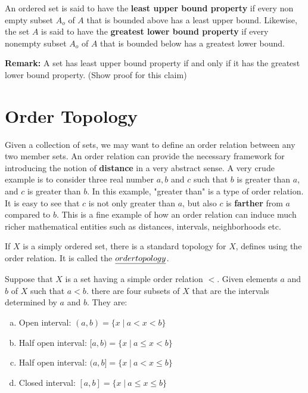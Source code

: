 \documentclass[a4paper,english,12pt]{article}
\begin{document}
\begin{defn}
An ordered set is said to have the \textbf{least upper bound property} if every non empty subset $A_{o}$ of $A$ that is bounded above has a least upper bound. Likewise, the set $A$ is said to have the \textbf{greatest lower bound property} if every nonempty subset $A_{o}$ of $A$ that is bounded below has a greatest lower bound. 
\end{defn}

\textbf{Remark:} A set has least upper bound property if and only if it has the greatest lower bound property. (Show proof for this claim)

\section{Order Topology}
Given a collection of sets, we may want to define an order relation between any two member sets. An order relation can provide the necessary framework for introducing the notion of \textbf{distance} in a very abstract sense. A very crude example is to consider three real number $a, b$ and $c$ such that $b$
is greater than $a$, and $c$ is greater than $b$. In this example, "greater than" is a type of order relation. It is easy to see that $c$ is not only greater than $a$, but also $c$ is \textbf{farther} from $a$ compared to $b$. This is a fine example of how an order relation can induce much richer mathematical entities such as distances, intervals, neighborhoods etc.  

If $X$ is a simply ordered set, there is a standard topology for $X$, defines using the order relation. It is called the $\emph{order topology}$.

Suppose that $X$ is a set having a simple order relation $<$. Given elements $a$ and $b$ of $X$ such that $a < b$. there are four subsets of $X$ that are the intervals determined by $a$ and $b$. They are:
\begin{enumerate}[a)]
\item Open interval: $(a, b) = \{ x\; | \: a < x < b  \}$
\item Half open interval: $[a, b) = \{ x\; | \: a \le x < b  \}$
\item Half open interval: $(a, b] = \{ x\; | \: a < x \le b  \}$
\item Closed interval: $[a, b] = \{ x\; | \: a \le x \le b  \}$
\end{enumerate}
 

 
\end{document}
